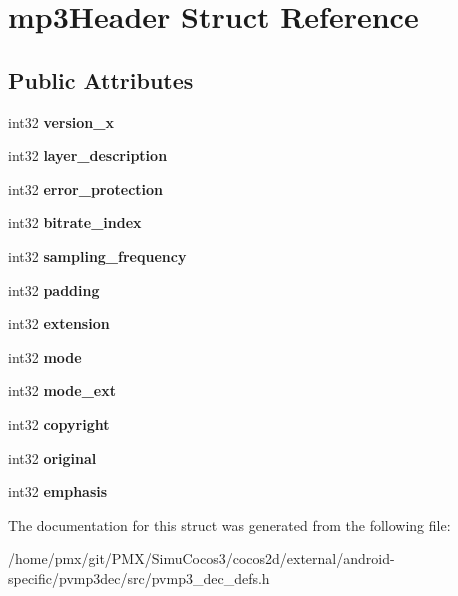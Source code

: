 \hypertarget{structmp3Header}{}\section{mp3\+Header Struct Reference}
\label{structmp3Header}
\subsection*{Public Attributes}
\begin{DoxyCompactItemize}
\item 
\mbox{\label{structmp3Header_a2eb463ba55599b4fe4d53b3e9b28d4b0}} 
int32 {\bfseries version\+\_\+x}
\item 
\mbox{\label{structmp3Header_a75171cc53efdf82b29d787b15474757c}} 
int32 {\bfseries layer\+\_\+description}
\item 
\mbox{\label{structmp3Header_add592696ec6c0c4178e803083a11c847}} 
int32 {\bfseries error\+\_\+protection}
\item 
\mbox{\label{structmp3Header_a7b0e546fe25a2dea5ec44664269bf6d5}} 
int32 {\bfseries bitrate\+\_\+index}
\item 
\mbox{\label{structmp3Header_ae9aa9415191ee583764ceb5b03ddb82e}} 
int32 {\bfseries sampling\+\_\+frequency}
\item 
\mbox{\label{structmp3Header_acad7bf063707dd18b6c2ec6dd4407691}} 
int32 {\bfseries padding}
\item 
\mbox{\label{structmp3Header_a5ec8a3ca574da065e952fd1747546989}} 
int32 {\bfseries extension}
\item 
\mbox{\label{structmp3Header_aecf94bad6718f906c0a129ad551bfe10}} 
int32 {\bfseries mode}
\item 
\mbox{\label{structmp3Header_a4524d4acdbd455fbdd48447a50c6f208}} 
int32 {\bfseries mode\+\_\+ext}
\item 
\mbox{\label{structmp3Header_ad76f2d5e6d8cfac3dbc88d50572032b7}} 
int32 {\bfseries copyright}
\item 
\mbox{\label{structmp3Header_aee933078368f2c41d4732184181258ea}} 
int32 {\bfseries original}
\item 
\mbox{\label{structmp3Header_a1c3c4b65d71c1874cd89ecb7f14fce34}} 
int32 {\bfseries emphasis}
\end{DoxyCompactItemize}


The documentation for this struct was generated from the following file\+:\begin{DoxyCompactItemize}
\item 
/home/pmx/git/\+P\+M\+X/\+Simu\+Cocos3/cocos2d/external/android-\/specific/pvmp3dec/src/pvmp3\+\_\+dec\+\_\+defs.\+h\end{DoxyCompactItemize}
